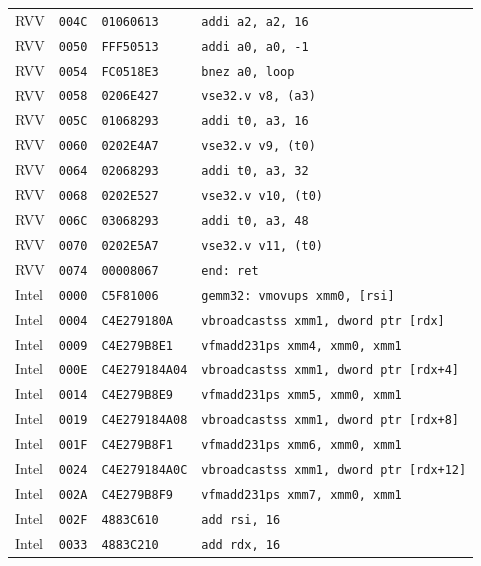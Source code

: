 \begin{table}[htbp]
\begin{tabular}{@{}l|l|l|p{7.2cm}@{}}
RVV & \texttt{004C} & \texttt{01060613} & \texttt{addi a2, a2, 16} \\
RVV & \texttt{0050} & \texttt{FFF50513} & \texttt{addi a0, a0, -1} \\
RVV & \texttt{0054} & \texttt{FC0518E3} & \texttt{bnez a0, loop} \\
RVV & \texttt{0058} & \texttt{0206E427} & \texttt{vse32.v v8, (a3)} \\
RVV & \texttt{005C} & \texttt{01068293} & \texttt{addi t0, a3, 16} \\
RVV & \texttt{0060} & \texttt{0202E4A7} & \texttt{vse32.v v9, (t0)} \\
RVV & \texttt{0064} & \texttt{02068293} & \texttt{addi t0, a3, 32} \\
RVV & \texttt{0068} & \texttt{0202E527} & \texttt{vse32.v v10, (t0)} \\
RVV & \texttt{006C} & \texttt{03068293} & \texttt{addi t0, a3, 48} \\
RVV & \texttt{0070} & \texttt{0202E5A7} & \texttt{vse32.v v11, (t0)} \\
RVV & \texttt{0074} & \texttt{00008067} & \texttt{end: ret} \\
\midrule
Intel & \texttt{0000} & \texttt{C5F81006} & \texttt{gemm32: vmovups xmm0, [rsi]} \\
Intel & \texttt{0004} & \texttt{C4E279180A} & \texttt{vbroadcastss xmm1, dword ptr [rdx]} \\
Intel & \texttt{0009} & \texttt{C4E279B8E1} & \texttt{vfmadd231ps xmm4, xmm0, xmm1} \\
Intel & \texttt{000E} & \texttt{C4E279184A04} & \texttt{vbroadcastss xmm1, dword ptr [rdx+4]} \\
Intel & \texttt{0014} & \texttt{C4E279B8E9} & \texttt{vfmadd231ps xmm5, xmm0, xmm1} \\
Intel & \texttt{0019} & \texttt{C4E279184A08} & \texttt{vbroadcastss xmm1, dword ptr [rdx+8]} \\
Intel & \texttt{001F} & \texttt{C4E279B8F1} & \texttt{vfmadd231ps xmm6, xmm0, xmm1} \\
Intel & \texttt{0024} & \texttt{C4E279184A0C} & \texttt{vbroadcastss xmm1, dword ptr [rdx+12]} \\
Intel & \texttt{002A} & \texttt{C4E279B8F9} & \texttt{vfmadd231ps xmm7, xmm0, xmm1} \\
Intel & \texttt{002F} & \texttt{4883C610} & \texttt{add rsi, 16} \\
Intel & \texttt{0033} & \texttt{4883C210} & \texttt{add rdx, 16} \\

\end{tabular}
\end{table}
